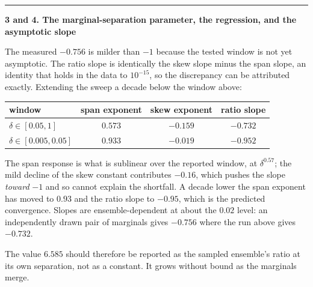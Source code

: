\documentclass[11pt]{article}
\newenvironment{item12}[1]{%
  \par\medskip\noindent\rule{\textwidth}{0.7pt}\par\nobreak\smallskip
  \noindent\textbf{\large #1}\par\nobreak\smallskip
}{\par\medskip}
\begin{document}
\begin{item12}{3 and 4. The marginal-separation parameter, the regression, and the asymptotic
slope}
The measured $-0.756$ is milder than $-1$ because the tested window is not yet asymptotic. The
ratio slope is identically the skew slope minus the span slope, an identity that holds in the
data to $10^{-15}$, so the discrepancy can be attributed exactly. Extending the sweep a decade
below the window above:

\begin{center}
\small
\begin{tabular}{@{}lccc@{}}
\toprule
window & span exponent & skew exponent & ratio slope\\
\midrule
$\delta\in[0.05,1]$     & $0.573$ & $-0.159$ & $-0.732$\\
$\delta\in[0.005,0.05]$ & $0.933$ & $-0.019$ & $-0.952$\\
\bottomrule
\end{tabular}
\end{center}

The span response is what is sublinear over the reported window, at $\delta^{0.57}$; the mild
decline of the skew constant contributes $-0.16$, which pushes the slope \emph{toward} $-1$ and
so cannot explain the shortfall. A decade lower the span exponent has moved to $0.93$ and the
ratio slope to $-0.95$, which is the predicted convergence. Slopes are ensemble-dependent at
about the $0.02$ level: an independently drawn pair of marginals gives $-0.756$ where the run
above gives $-0.732$.

The value $6.585$ should therefore be reported as the sampled ensemble's ratio at its own
separation, not as a constant. It grows without bound as the marginals merge.
\end{item12}
\end{document}
